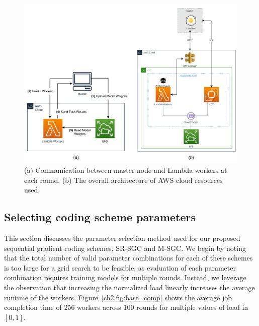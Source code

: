 \begin{figure}[t]
    \centering
    \includegraphics[width=\textwidth]{figs/ch2/aws.pdf}
    \caption{(a) Communication between master node and Lambda workers at each round. (b) The overall architecture of AWS cloud resources used.}
    \label{ch2:fig:aws}
\end{figure}

\FloatBarrier


\subsection{Selecting coding scheme parameters}\label{ch2:sec:param_selection}

This section discusses the parameter selection method used for our proposed sequential gradient coding schemes, SR-SGC and M-SGC. We begin by noting that the total number of valid parameter combinations for each of these schemes is too large for a grid search to be feasible, as evaluation of each parameter combination requires training models for multiple rounds. Instead, we leverage the observation that increasing the normalized load linearly increases the average runtime of the workers. 
Figure~\ref{ch2:fig:base_comp} shows the average job completion time of 256 workers across 100 rounds for multiple values of load in $[0, 1]$. 


